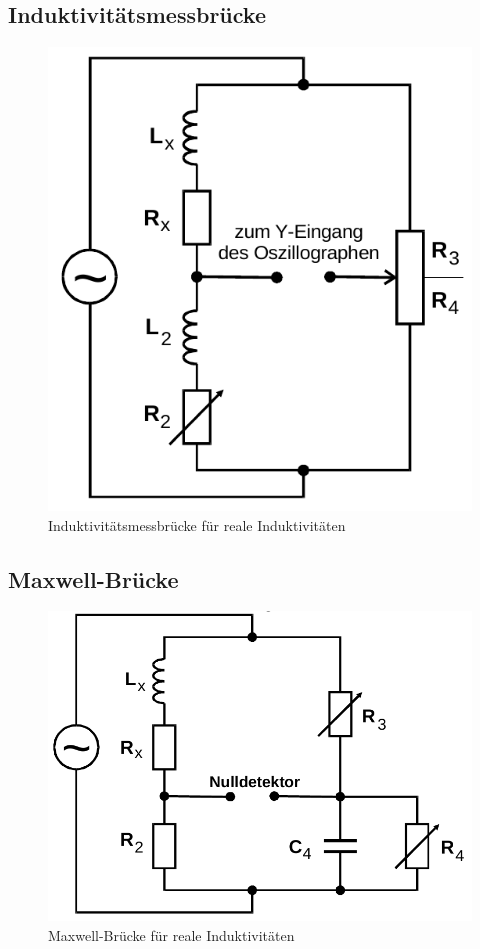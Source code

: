 \subsection{Induktivitätsmessbrücke}         
\label{sec:Lbrücke}

\begin{figure}[H]
    \centering
    \includegraphics[scale=0.4]{pictures/4-L.png}
    \caption{Induktivitätsmessbrücke für reale Induktivitäten}
    \label{fig:Lbrücke}
\end{figure}

\subsection{Maxwell-Brücke}                  
\label{sec:maxwell}

\begin{figure}[H]
    \centering
    \includegraphics[scale=0.4]{pictures/5-maxwell.png}
    \caption{Maxwell-Brücke für reale Induktivitäten}
    \label{fig:maxwell}
\end{figure}

